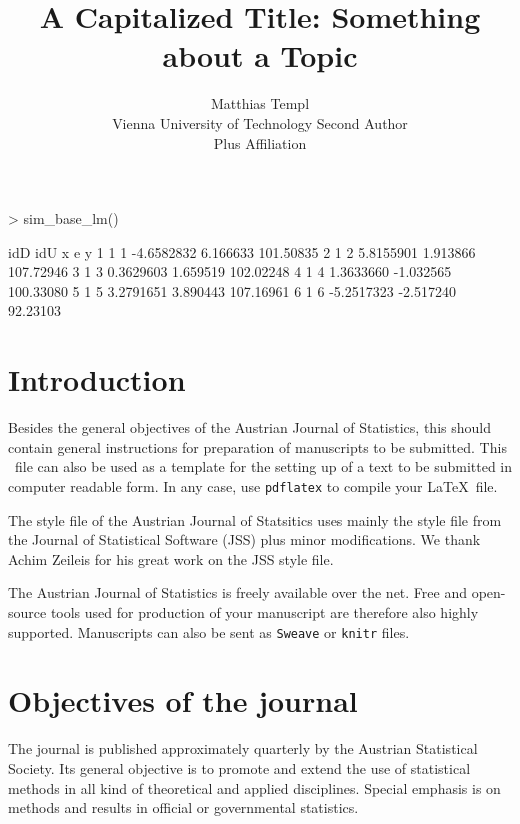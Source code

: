 \documentclass[article]{ajs}
\author{Matthias Templ\\ Vienna University of Technology \And 
        Second Author\\Plus Affiliation}
\title{A Capitalized Title: Something about a Topic}
\begin{document}


\begin{Schunk}
\begin{Sinput}
> sim_base_lm()
\end{Sinput}
\begin{Soutput}
  idD idU          x         e         y
1   1   1 -4.6582832  6.166633 101.50835
2   1   2  5.8155901  1.913866 107.72946
3   1   3  0.3629603  1.659519 102.02248
4   1   4  1.3633660 -1.032565 100.33080
5   1   5  3.2791651  3.890443 107.16961
6   1   6 -5.2517323 -2.517240  92.23103
\end{Soutput}
\end{Schunk}

\section{Introduction}

Besides the general objectives of the Austrian Journal of
Statistics, this should contain general instructions for
preparation of manuscripts to be submitted. This \LaTeXe\ file can
also be used as a template for the setting up of a text to be
submitted in computer readable form. In any case, use \texttt{pdflatex} to compile your \LaTeX \ file.

The style file of the Austrian Journal of Statsitics uses mainly the style file from the Journal of Statistical Software (JSS) plus minor modifications. We thank Achim Zeileis for his great work on the JSS style file.


The Austrian Journal of Statistics is freely available over the net. Free and open-source tools used for production of your manuscript are therefore also highly supported. Manuscripts can also be sent as \texttt{Sweave} \citep[see, e.g.,][]{leisch02} or \texttt{knitr} \citep{yihui13} files.



\section{Objectives of the journal}

The journal is published approximately quarterly by the Austrian
Statistical Society. Its general objective is to promote and
extend the use of statistical methods in all kind of theoretical
and applied disciplines. Special emphasis is on methods and
results in official or governmental statistics.
\end{document}
